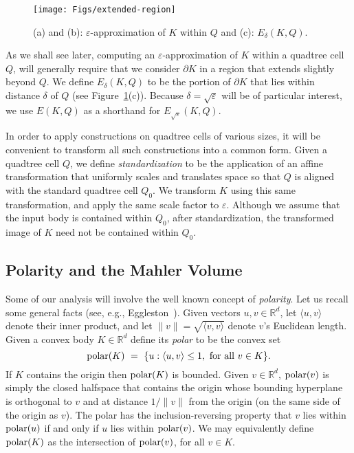 \documentclass[11pt]{article}   \usepackage[letterpaper,hmargin=2.1cm,vmargin=3cm]{geometry}
\newcommand{\ang}[1]{\langle #1\rangle}
\newcommand{\RE}{\mathbb{R}}    \newcommand{\ZZ}{\mathbb{Z}}    \newcommand{\eps}{\varepsilon}  \newcommand{\ST}{\,:\,}         \newcommand{\sq}{\square}
\begin{document}
\begin{figure}[htbp]
  \centerline{\texttt{[image: Figs/extended-region]}}
  \caption{(a) and (b): $\eps$-approximation of $K$ within $Q$ and (c): $E_{\delta}(K,Q)$.}
  \label{fig:extended-region}
\end{figure}


As we shall see later, computing an $\eps$-approximation of $K$ within a quadtree cell $Q$, will generally require that we consider $\partial K$ in a region that extends slightly beyond $Q$. We define $E_{\delta}(K,Q)$ to be the portion of $\partial K$ that lies within distance $\delta$ of $Q$ (see Figure~\ref{fig:extended-region}(c)). Because $\delta = \sqrt{\eps}$ will be of particular interest, we use $E(K,Q)$ as a shorthand for $E_{\sqrt{\eps}}(K,Q)$.

In order to apply constructions on quadtree cells of various sizes, it will be convenient to transform all such constructions into a common form. Given a quadtree cell $Q$, we define \emph{standardization} to be the application of an affine transformation that uniformly scales and translates space so that $Q$ is aligned with the standard quadtree cell $Q_0$. We transform $K$ using this same transformation, and apply the same scale factor to $\eps$. Although we assume that the input body is contained within $Q_0$, after standardization, the transformed image of $K$ need not be contained within $Q_0$.

\subsection{Polarity and the Mahler Volume} \label{sec:prelim-polar}


Some of our analysis will involve the well known concept of \emph{polarity}. Let us recall some general facts (see, e.g., Eggleston~\cite{Egg58}). Given vectors $u, v \in \RE^d$, let $\ang{u,v}$ denote their inner product, and let $\|v\| = \sqrt{\ang{v,v}}$ denote $v$'s Euclidean length. Given a convex body $K \in \RE^d$ define its \emph{polar} to be the convex set
\[
	\polar{K}
		~ = ~ \{ u : \ang{u,v} \le 1, \hbox{~for all $v \in K$} \}.
\]
If $K$ contains the origin then $\mathrm{polar}(K)$ is bounded. Given $v \in \RE^d$, $\mathrm{polar}(v)$ is simply the closed halfspace that contains the origin whose bounding hyperplane is orthogonal to $v$ and at distance $1/\|v\|$ from the origin (on the same side of the origin as $v$). The polar has the inclusion-reversing property that $v$ lies within $\mathrm{polar}(u)$ if and only if $u$ lies within $\mathrm{polar}(v)$. We may equivalently define $\mathrm{polar}(K)$ as the intersection of $\mathrm{polar}(v)$, for all $v \in K$. 
\end{document}
